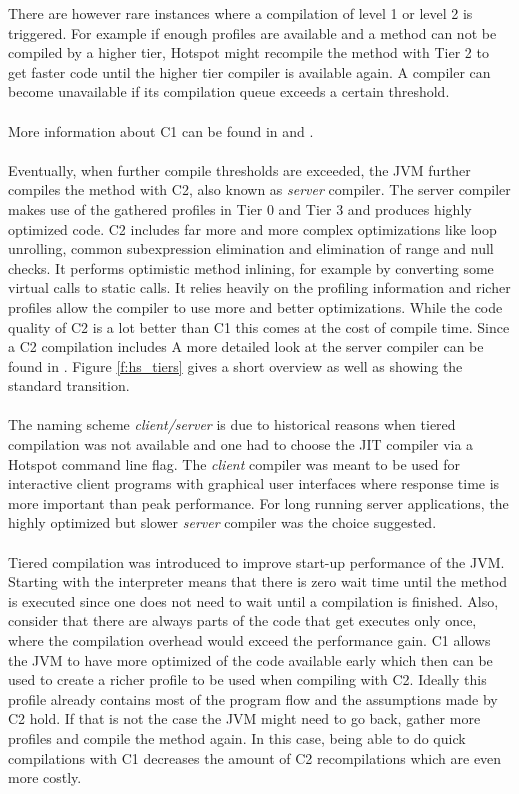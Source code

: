 There are however rare instances where a compilation of level 1 or level 2 is triggered. For example if enough profiles are available and a method can not be compiled by a higher tier, Hotspot might recompile the method with Tier 2 to get faster code until the higher tier compiler is available again. A compiler can become unavailable if its compilation queue exceeds a certain threshold.
\\\\
More information about C1 can be found in \cite{client_compiler_talk} and \cite{client_compiler}.
\\\\
Eventually, when further compile thresholds are exceeded, the JVM further compiles the method with C2, also known as \textit{server} compiler.
The server compiler makes use of the gathered profiles in Tier 0 and Tier 3 and produces highly optimized code. C2 includes far more and more complex optimizations like loop unrolling, common subexpression elimination and elimination of range and null checks. It performs optimistic method inlining, for example by converting some virtual calls to static calls. It relies heavily on the profiling information and richer profiles allow the compiler to use more and better optimizations.
While the code quality of C2 is a lot better than C1 this comes at the cost of compile time. Since a C2 compilation includes 
A more detailed look at the server compiler can be found in \cite{server_compiler}.
Figure \ref{f:hs_tiers} gives a short overview as well as showing the standard transition.
\\\\
The naming scheme \textit{client/server} is due to historical reasons when tiered compilation was not available and one had to choose the JIT compiler via a Hotspot command line flag. The \textit{client} compiler was meant to be used for interactive client programs with graphical user interfaces where response time is more important than peak performance. For long running server applications, the highly optimized but slower \textit{server} compiler was the choice suggested. 
\\\\
Tiered compilation was introduced to improve start-up performance of the JVM.
Starting with the interpreter means that there is zero wait time until the method is executed since one does not need to wait until a compilation is finished. Also, consider that there are always parts of the code that get executes only once, where the compilation overhead would exceed the performance gain. C1 allows the JVM to have more optimized of the code available early which then can be used to create a richer profile to be used when compiling with C2. Ideally this profile already contains most of the program flow and the assumptions made by C2 hold. If that is not the case the JVM might need to go back, gather more profiles and compile the method again. In this case, being able to do quick compilations with C1 decreases the amount of C2 recompilations which are even more costly.

